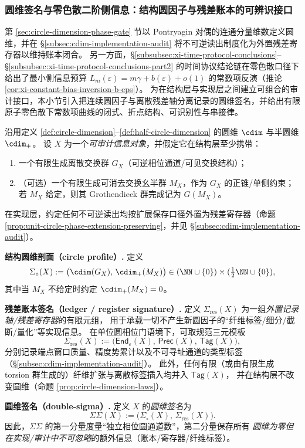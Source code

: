 \subsubsection{圆维签名与零色散二阶侧信息：结构圆因子与残差账本的可辨识接口}\label{subsubsec:xi-cdim-signature-zero-dispersion}
第 \ref{sec:circle-dimension-phase-gate} 节以 Pontryagin 对偶的连通分量维数定义圆维，并在 \S\ref{subsec:cdim-implementation-audit} 将不可逆读出制度化为外置残差寄存器以维持账本闭合。
另一方面，\S\ref{subsubsec:xi-time-protocol-conclusions}--\S\ref{subsubsec:xi-time-protocol-conclusions-part2} 的时间协议结论链在零色散口径下给出了最小侧信息预算 \(L_m(\varepsilon)=m\gamma+b(\varepsilon)+o(1)\) 的常数项反演（推论 \ref{cor:xi-constant-bias-inversion-b-eps}）。
为在结构层与实现层之间建立可组合的审计接口，本小节引入把连续圆因子与离散残差轴分离记录的圆维签名，并给出有限原子零色散下常数项曲线的闭式、折点结构、可识别性与串接律。
\par

\begin{definition}
\label{def:cdim-signature}
沿用定义 \ref{def:circle-dimension}--\ref{def:half-circle-dimension} 的圆维 \(\cdim\) 与半圆维 \(\cdim_{+}\)。
设 \(X\) 为一个\emph{可审计信息对象}，并假定它在结构层至少携带：
\begin{enumerate}
  \item 一个有限生成离散交换群 \(G_X\)（可逆相位通道/可见交换结构）；
  \item （可选）一个有限生成可消去交换幺半群 \(M_X\)，作为 \(G_X\) 的正锥/单侧约束；
        若 \(M_X\) 给定，则其 Grothendieck 群完成记为 \(G(M_X)\)。
\end{enumerate}
在实现层，约定任何不可逆读出均按扩展保存口径外置为残差寄存器（命题 \ref{prop:unit-circle-phase-extension-preserving}，并见 \S\ref{subsec:cdim-implementation-audit}）。
\smallskip

\noindent\textbf{结构圆维剖面（circle profile）.}
定义
\[
\Sigma_{\circ}(X)
:=\bigl(\cdim(G_X),\,\cdim_{+}(M_X)\bigr)
\in (\NN\cup\{0\})\times(\tfrac12\NN\cup\{0\}),
\]
其中当 \(M_X\) 不给定时约定 \(\cdim_{+}(M_X)=0\)。
\smallskip

\noindent\textbf{残差账本签名（ledger / register signature）.}
定义 \(\Sigma_{\mathrm{res}}(X)\) 为一组\emph{外置记录轴/残差寄存器}的有限元组，
用于承载一切不产生新圆因子的“纤维标签/细分/截断/量化”等实现信息。
在单位圆相位门语境下，可取规范三元模板
\[
\Sigma_{\mathrm{res}}(X)
:=\bigl(\mathsf{End}_\varepsilon(X),\,\mathsf{Prec}(X),\,\mathsf{Tag}(X)\bigr),
\]
分别记录端点窗口质量、精度势累计以及不可寻址通道的类型标签（\S\ref{subsec:cdim-implementation-audit}）。
此外，任何有限（或由有限生成 torsion 群生成的）纤维扩张与离散标签插入均并入 \(\mathsf{Tag}(X)\)，
并在结构层不改变圆维（命题 \ref{prop:circle-dimension-laws}）。
\smallskip

\noindent\textbf{圆维签名（double-sigma）.}
定义 \(X\) 的\emph{圆维签名}为
\[
\Sigma\Sigma(X)
:=\bigl(\Sigma_{\circ}(X),\,\Sigma_{\mathrm{res}}(X)\bigr).
\]
因此，\(\Sigma\Sigma\) 的第一分量度量“独立相位圆通道数”，第二分量保存所有
\emph{圆维为零但在实现/审计中不可忽略}的额外信息（账本/寄存器/纤维标签）。
\end{definition}

